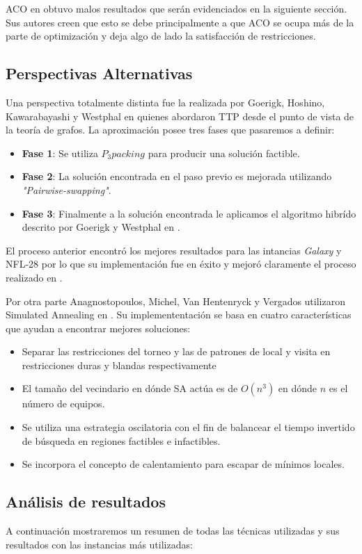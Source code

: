 \documentclass[letter, 10pt]{article}
\begin{document}
    ACO en \cite{ant_viejo} obtuvo malos resultados que serán evidenciados en la siguiente sección. Sus autores creen que esto se debe principalmente a que ACO se ocupa más de la parte de optimización y deja algo de lado la satisfacción de restricciones.
    
\subsection{Perspectivas Alternativas}
    Una perspectiva totalmente distinta fue la realizada por Goerigk, Hoshino, Kawarabayashi y Westphal en \cite{grafos} quienes abordaron TTP desde el punto de vista de la teoría de grafos. La aproximación posee tres fases que pasaremos a definir:
\begin{itemize}
    \item \textbf{Fase 1}: Se utiliza $P_3 packing$ para producir una solución factible.
    \item \textbf{Fase 2}: La solución encontrada en el paso previo es mejorada utilizando \emph{"Pairwise-swapping"}.
    \item \textbf{Fase 3}: Finalmente a la solución encontrada le aplicamos el algoritmo hibrído descrito por Goerigk y Westphal en \cite{combined}.
\end{itemize}
    El proceso anterior encontró los mejores resultados para las intancias \emph{Galaxy} y NFL-28 por lo que su implementación fue en éxito y mejoró claramente el proceso realizado en \cite{combined}.
    
    Por otra parte Anagnostopoulos, Michel, Van Hentenryck y Vergados utilizaron Simulated Annealing en \cite{simulated}. Su implemententación se basa en cuatro características que ayudan a encontrar mejores soluciones:
\begin{itemize}
    \item Separar las restricciones del torneo y las de patrones de local y visita en restricciones duras y blandas respectivamente
    \item El tamaño del vecindario en dónde SA actúa es de $O(n^3)$ en dónde $n$ es el número de equipos.
    \item Se utiliza una estrategia oscilatoria con el fin de balancear el tiempo invertido de búsqueda en regiones factibles e infactibles.
    \item  Se incorpora el concepto de calentamiento para escapar de mínimos locales.
\end{itemize}

\subsection{Análisis de resultados}   
    A continuación mostraremos un resumen de todas las técnicas utilizadas y sus resultados con las instancias más utilizadas:
\end{document}

